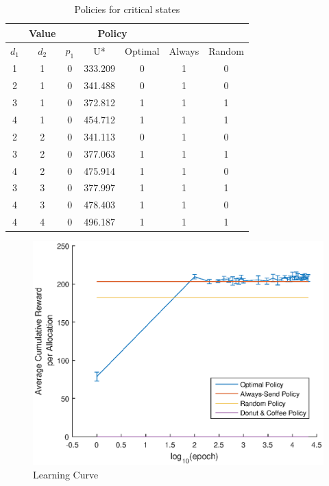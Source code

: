 \documentclass[10pt,journal]{IEEEtran}
\begin{document}
\begin{table}                        
\centering                           
\begin{tabular}{|c|c|c|c|c|c|c|}
\firsthline
\multicolumn{3}{|c|}{\textbf{State}} & \textbf{Value} & \multicolumn{3}{c|}{\textbf{Policy}} \\
\hline 
$d_{1}$ & $d_2$ & $p_1$ & U* & Optimal & Always & Random\\
\hline
    1 & 1 & 0 & 333.209 & 0 & 1 & 0 \\
    \hline
    2 & 1 & 0 & 341.488 & 0 & 1 & 0 \\
    \hline
    3 & 1 & 0 & 372.812 & 1 & 1 & 1 \\
    \hline
    4 & 1 & 0 & 454.712 & 1 & 1 & 1 \\
    \hline
    2 & 2 & 0 & 341.113 & 0 & 1 & 0 \\
    \hline
    3 & 2 & 0 & 377.063 & 1 & 1 & 1 \\
    \hline
    4 & 2 & 0 & 475.914 & 1 & 1 & 0 \\
    \hline
    3 & 3 & 0 & 377.997 & 1 & 1 & 1 \\
    \hline
    4 & 3 & 0 & 478.403 & 1 & 1 & 0 \\
    \hline
    4 & 4 & 0 & 496.187 & 1 & 1 & 1 \\
    \hline                             
\end{tabular}                        
\caption{Policies for critical states}             
\label{table:MyTableLabel}           
\end{table}  

\begin{figure}[!t]
	\centering
    \includegraphics[width=0.9\columnwidth]{"Figures/donutcoffeepolicy"}
	\caption{Learning Curve}
    \label{fig:LearningCurve}
\end{figure}
\end{document}
